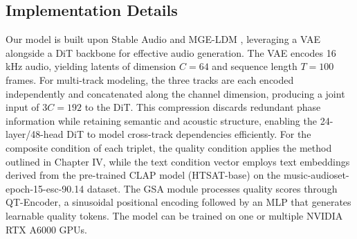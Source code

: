 \documentclass[lettersize,journal]{IEEEtran}
\begin{document}
\subsection{Implementation Details }
Our model is built upon Stable Audio \cite{evans2025stable} and MGE-LDM \cite{chae2025mge}, leveraging a VAE alongside a DiT backbone \cite{peebles2023scalable} for effective audio generation. The VAE encodes 16 kHz audio, yielding latents of dimension $C=64$ and sequence length $T=100$ frames. For multi-track modeling, the three tracks are each encoded independently and concatenated along the channel dimension, producing a joint input of $3C=192$ to the DiT. This compression discards redundant phase information while retaining semantic and acoustic structure, enabling the 24-layer/48-head DiT to model cross-track dependencies efficiently. For the composite condition of each triplet, the quality condition applies the method outlined in Chapter IV, while the text condition vector employs text embeddings derived from the pre-trained CLAP model (HTSAT-base) on the music-audioset-epoch-15-esc-90.14 dataset. The GSA module processes quality scores through QT-Encoder, a sinusoidal positional encoding followed by an MLP that generates learnable quality tokens. The model can be trained on one or multiple NVIDIA RTX A6000 GPUs.
\end{document}
